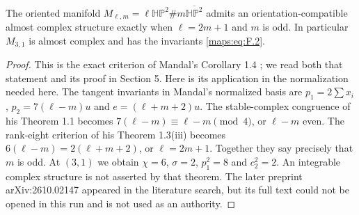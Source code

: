 

The oriented manifold
$M_{\ell,m}=\ell\mathbb{HP}^2\#m\overline{\mathbb{HP}^2}$
admits an orientation-compatible almost complex structure exactly
when $\ell=2m+1$ and $m$ is odd.  In particular $M_{3,1}$ is
almost complex and has the invariants \eqref{maps:eq:F.2}.

\begin{proof}
This is the exact criterion of Mandal's Corollary 1.4
\cite{ffMandal}; we read both that statement and its proof in
Section 5.  Here is its application in the normalization needed
here.  The tangent invariants in Mandal's normalized basis are
$p_1=2\sum x_i$, $p_2=7(\ell-m)u$ and
$e=(\ell+m+2)u$.  The stable-complex congruence of his
Theorem 1.1 becomes
$7(\ell-m)\equiv\ell-m\pmod4$, or $\ell-m$ even.
The rank-eight criterion of his Theorem 1.3(iii) becomes
$6(\ell-m)=2(\ell+m+2)$, or $\ell=2m+1$.
Together they say precisely that $m$ is odd.  At $(3,1)$ we
obtain $\chi=6$, $\sigma=2$, $p_1^2=8$ and $c_2^2=2$.
An integrable complex structure is not asserted by that theorem.
The later preprint arXiv:2610.02147 appeared in the literature
search, but its full text could not be opened in this run and
is not used as an authority.
\end{proof}


